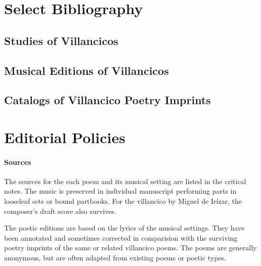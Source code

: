 \section{Select Bibliography}

\subsection{Studies of Villancicos}
\nocite{Rubio:Forma}
\nocite{Laird:VC}
\nocite{Torrente:PhD}
\nocite{Tenorio:SorJuana}
\nocite{CaberoPueyo:PhD}
\nocite{Illari:Polychoral}
\nocite{Knighton-Torrente:VCs}
\nocite{Cashner:Cards}
\printbibliography[heading=none,filter=villancico-studies]

\subsection{Musical Editions of Villancicos}
\nocite{Cererols:MEM-VC}
\nocite{Stevenson:Christmas}
\nocite{Ruimonte:Parnaso}
\nocite{Padilla:Tello}
\nocite{Ezquerro:MME55}
\nocite{RuizSamaniego:MME63}
\nocite{Ezquerro:MME59}
\nocite{Ezquerro:MME65}
\nocite{Fernandez:Cancionero}
\nocite{Torrejon:VCs}
\printbibliography[heading=none,filter=villancico-editions]

\subsection{Catalogs of Villancico Poetry Imprints}
\nocite{BNE:VCs17C}
\nocite{BNE:VCs18C}
\nocite{UK:VCs}
\nocite{US:VCs}
\printbibliography[heading=none,filter=villancico-imprint-catalogs]

\section{Editorial Policies}

\paragraph{Sources}

The sources for the each poem and its musical setting are listed in the critical notes.
The music is preserved in individual manuscript performing parts in looseleaf sets or bound partbooks.
For the villancico by Miguel de Irízar, the composer's draft score also survives.

The poetic editions are based on the lyrics of the musical settings.
They have been annotated and sometimes corrected in comparision with the surviving poetry imprints of the same or related villancico poems.
The poems are generally anonymous, but are often adapted from existing poems or poetic types.

